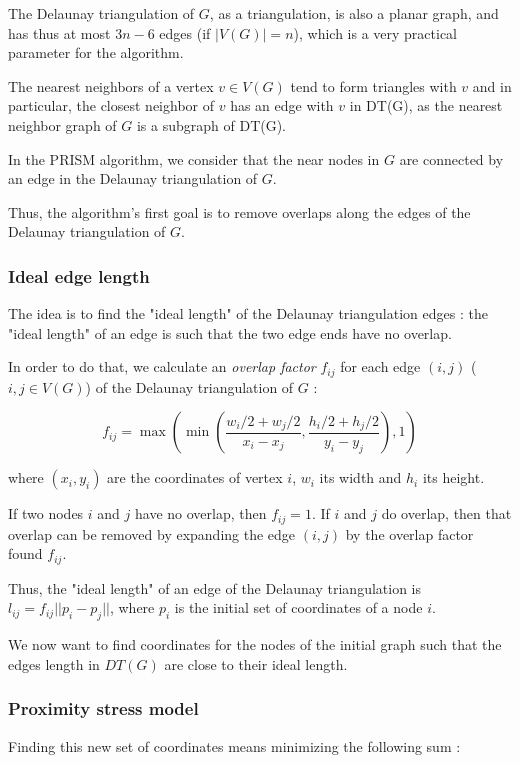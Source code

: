 \documentclass[12pt]{report}
\begin{document}
The Delaunay triangulation of $G$, as a triangulation, is also a planar graph, and has thus at most $3n -6$ edges (if $|V(G)| = n$), which is a very practical parameter for the algorithm.

\bigskip

The nearest neighbors of a vertex $v \in V(G)$ tend to form triangles with $v$ and in particular, the closest neighbor of $v$ has an edge with $v$ in DT(G), as the nearest neighbor graph of $G$ is a subgraph of DT(G).

In the PRISM algorithm, we consider that the near nodes in $G$ are connected by an edge in the Delaunay triangulation of $G$.

Thus, the algorithm's first goal is to remove overlaps along the edges of the Delaunay triangulation of $G$.

\subsubsection{Ideal edge length}
The idea is to find the "ideal length" of the Delaunay triangulation edges : the "ideal length" of an edge is such that the two edge ends have no overlap.

\bigskip
In order to do that, we calculate an \emph{overlap factor} $f_{ij}$ for each edge $(i,j)$ ($i,j \in V(G)$) of the Delaunay triangulation of $G$ :

\[ f_{ij} = \max ( \min (\frac{w_i/2 + w_j/2}{x_i - x_j}, 
\frac{h_i/2 + h_j/2}{y_i - y_j}), 1)\]

where $(x_i,y_i)$ are the coordinates of vertex $i$, $w_i$ its width and $h_i$ its height.

If two nodes $i$ and $j$ have no overlap, then $f_{ij} = 1$. 
If $i$ and $j$ do overlap, then that overlap can be removed by expanding the edge $(i,j)$ by the overlap factor found $f_{ij}$. %

\bigskip
Thus, the "ideal length" of an edge of the Delaunay triangulation is $l_{ij} = f_{ij}||p_i - p_j||$, where $p_i$ is the initial set of coordinates of a node $i$.

We now want to find coordinates for the nodes of the initial graph such that the edges length in $DT(G)$ are close to their ideal length.

\subsubsection{Proximity stress model}

Finding this new set of coordinates means minimizing the following sum :
\end{document}
